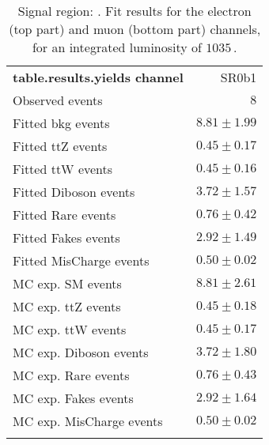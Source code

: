 

\begin{table}
\begin{center}
\setlength{\tabcolsep}{0.0pc}
{\small
\begin{tabular*}{\textwidth}{@{\extracolsep{\fill}}lr}
\noalign{\smallskip}\hline\noalign{\smallskip}
{\bf table.results.yields channel}           & SR0b1              \\[-0.05cm]
\noalign{\smallskip}\hline\noalign{\smallskip}
Observed events          & $8$                    \\
\noalign{\smallskip}\hline\noalign{\smallskip}
Fitted bkg events         & $8.81 \pm 1.99$              \\
\noalign{\smallskip}\hline\noalign{\smallskip}
        Fitted ttZ events         & $0.45 \pm 0.17$              \\
        Fitted ttW events         & $0.45 \pm 0.16$              \\
        Fitted Diboson events         & $3.72 \pm 1.57$              \\
        Fitted Rare events         & $0.76 \pm 0.42$              \\
        Fitted Fakes events         & $2.92 \pm 1.49$              \\
        Fitted MisCharge events         & $0.50 \pm 0.02$              \\
 \noalign{\smallskip}\hline\noalign{\smallskip}
MC exp. SM events              & $8.81 \pm 2.61$              \\
\noalign{\smallskip}\hline\noalign{\smallskip}
        MC exp. ttZ events         & $0.45 \pm 0.18$              \\
        MC exp. ttW events         & $0.45 \pm 0.17$              \\
        MC exp. Diboson events         & $3.72 \pm 1.80$              \\
        MC exp. Rare events         & $0.76 \pm 0.43$              \\
        MC exp. Fakes events         & $2.92 \pm 1.64$              \\
        MC exp. MisCharge events         & $0.50 \pm 0.02$              \\
\noalign{\smallskip}\hline\noalign{\smallskip}
\end{tabular*}
}
\end{center}
\caption{Signal region: . Fit results for the electron (top part) and muon (bottom part) channels, for an integrated luminosity of $1035$\,\ipb.
}
\end{table}

